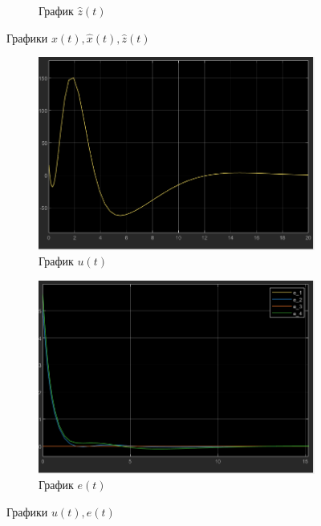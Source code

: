 \documentclass[a4paper, 12pt]{article}
\begin{document}
\begin{figure}[H]
\begin{subfigure}{0.45\textwidth}
            \caption{График $\hat{z}(t)$}
            \label{fig:task_4_z}
        \end{subfigure}
        \caption{Графики $x(t),\hat{x}(t),\hat{z}(t)$}
        \label{fig:task_4_modeling}
    \end{figure}
    \begin{figure}[H]
        \centering
        \begin{subfigure}{0.45\textwidth}
            \centering
            \includegraphics[width=\linewidth]{u_t_task4.png}
            \caption{График $u(t)$}
            \label{fig:u_task_4}
        \end{subfigure}
        \hfill
        \begin{subfigure}{0.45\textwidth}
            \centering
            \includegraphics[width=\linewidth]{e_task4.png}
            \caption{График $e(t)$}
            \label{fig:task_4_e}
        \end{subfigure}
        \caption{Графики $u(t),e(t)$}
        \label{fig:task_4_modeling_2}
    \end{figure}
\end{document}
